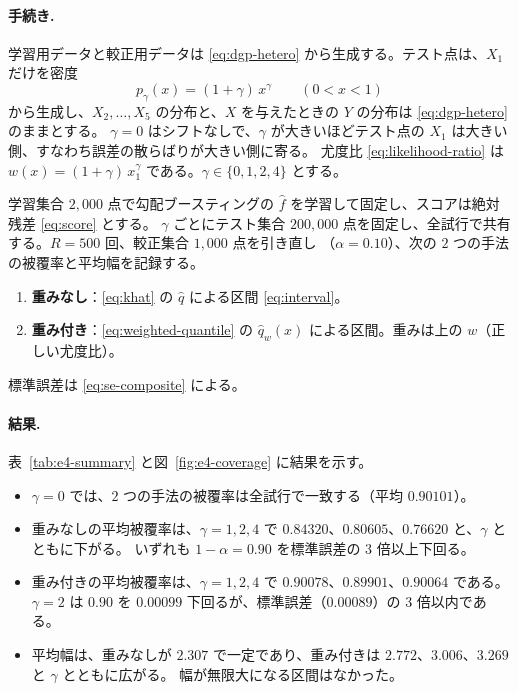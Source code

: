 \documentclass[a4paper,11pt]{jsarticle}
\theoremstyle{definition}
\theoremstyle{plain}
\theoremstyle{remark}
\newcommand{\qhat}{\hat{q}}
\newcommand{\fhat}{\hat{f}}
\begin{document}
\paragraph{手続き.}
学習用データと較正用データは \eqref{eq:dgp-hetero} から生成する。テスト点は、$X_1$ だけを密度
\begin{equation}
  \label{eq:dgp-shift}
  p_\gamma(x)=(1+\gamma)\,x^{\gamma}\qquad(0<x<1)
\end{equation}
から生成し、$X_2,\dots,X_5$ の分布と、$X$ を与えたときの $Y$ の分布は \eqref{eq:dgp-hetero} のままとする。
$\gamma=0$ はシフトなしで、$\gamma$ が大きいほどテスト点の $X_1$ は大きい側、すなわち誤差の散らばりが大きい側に寄る。
尤度比 \eqref{eq:likelihood-ratio} は $w(x)=(1+\gamma)\,x_1^{\gamma}$ である。$\gamma\in\{0,1,2,4\}$ とする。

学習集合 $2{,}000$ 点で勾配ブースティングの $\fhat$ を学習して固定し、スコアは絶対残差 \eqref{eq:score} とする。
$\gamma$ ごとにテスト集合 $200{,}000$ 点を固定し、全試行で共有する。$R=500$ 回、較正集合 $1{,}000$ 点を引き直し
（$\alpha=0.10$）、次の $2$ つの手法の被覆率と平均幅を記録する。
\begin{enumerate}
  \item[(a)] \textbf{重みなし}：\eqref{eq:khat} の $\qhat$ による区間 \eqref{eq:interval}。
  \item[(b)] \textbf{重み付き}：\eqref{eq:weighted-quantile} の $\qhat_w(x)$ による区間。重みは上の $w$（正しい尤度比）。
\end{enumerate}
標準誤差は \eqref{eq:se-composite} による。

\paragraph{結果.}
表~\ref{tab:e4-summary} と図~\ref{fig:e4-coverage} に結果を示す。
\begin{itemize}
  \item $\gamma=0$ では、$2$ つの手法の被覆率は全試行で一致する（平均 $0.90101$）。
  \item 重みなしの平均被覆率は、$\gamma=1,2,4$ で $0.84320$、$0.80605$、$0.76620$ と、$\gamma$ とともに下がる。
    いずれも $1-\alpha=0.90$ を標準誤差の $3$ 倍以上下回る。
  \item 重み付きの平均被覆率は、$\gamma=1,2,4$ で $0.90078$、$0.89901$、$0.90064$ である。
    $\gamma=2$ は $0.90$ を $0.00099$ 下回るが、標準誤差（$0.00089$）の $3$ 倍以内である。
  \item 平均幅は、重みなしが $2.307$ で一定であり、重み付きは $2.772$、$3.006$、$3.269$ と $\gamma$ とともに広がる。
    幅が無限大になる区間はなかった。
\end{itemize}
\end{document}

